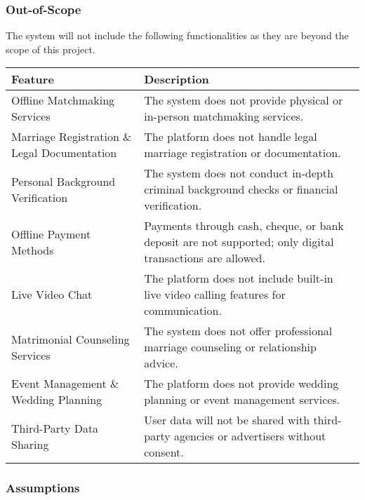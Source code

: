 \subsubsection{Out-of-Scope}\label{out-of-scope}

The system will not include the following functionalities as they are
beyond the scope of this project.

\begin{longtable}[]{@{}
  >{\raggedright\arraybackslash}p{}
  >{\raggedright\arraybackslash}p{}@{}}
\toprule\noalign{}
\begin{minipage}[b]{\linewidth}\raggedright
Feature
\end{minipage} & \begin{minipage}[b]{\linewidth}\raggedright
Description
\end{minipage} \\
\midrule\noalign{}
\endhead
\bottomrule\noalign{}
\endlastfoot
Offline Matchmaking Services & The system does not provide physical or
in-person matchmaking services. \\
Marriage Registration \& Legal Documentation & The platform does not
handle legal marriage registration or documentation. \\
Personal Background Verification & The system does not conduct in-depth
criminal background checks or financial verification. \\
Offline Payment Methods & Payments through cash, cheque, or bank deposit
are not supported; only digital transactions are allowed. \\
Live Video Chat & The platform does not include built-in live video
calling features for communication. \\
Matrimonial Counseling Services & The system does not offer professional
marriage counseling or relationship advice. \\
Event Management \& Wedding Planning & The platform does not provide
wedding planning or event management services. \\
Third-Party Data Sharing & User data will not be shared with third-party
agencies or advertisers without consent. \\
\end{longtable}

\subsubsection{Assumptions}\label{assumptions}

